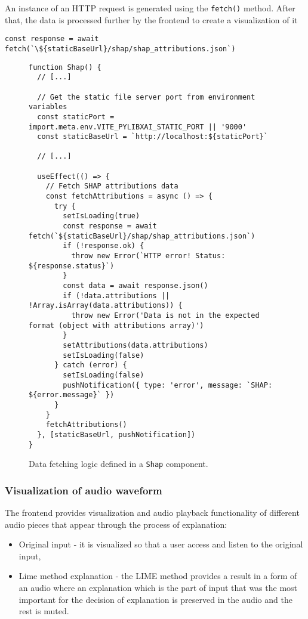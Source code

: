 \documentclass[
    bindingoffset=5mm,  %
    footnoteindent=3mm, %
    hyphenation=true    %
]{src/wut-thesis}
\begin{document}
An instance of an HTTP request is generated using the \texttt{fetch()} method. After that, the data is processed further by the frontend to create a visualization of it
\begin{verbatim}
const response = await fetch(`\${staticBaseUrl}/shap/shap_attributions.json`)
\end{verbatim}

\begin{figure}%
\begin{verbatim}
function Shap() {
  // [...]

  // Get the static file server port from environment variables
  const staticPort = import.meta.env.VITE_PYLIBXAI_STATIC_PORT || '9000'
  const staticBaseUrl = `http://localhost:${staticPort}`

  // [...]

  useEffect(() => {
    // Fetch SHAP attributions data
    const fetchAttributions = async () => {
      try {
        setIsLoading(true)
        const response = await fetch(`${staticBaseUrl}/shap/shap_attributions.json`)
        if (!response.ok) {
          throw new Error(`HTTP error! Status: ${response.status}`)
        }
        const data = await response.json()
        if (!data.attributions || !Array.isArray(data.attributions)) {
          throw new Error('Data is not in the expected format (object with attributions array)')
        }
        setAttributions(data.attributions)
        setIsLoading(false)
      } catch (error) {
        setIsLoading(false)
        pushNotification({ type: 'error', message: `SHAP: ${error.message}` })
      }
    }
    fetchAttributions()
  }, [staticBaseUrl, pushNotification])
}
\end{verbatim}
\caption{Data fetching logic defined in a \texttt{Shap} component.}
\label{fig:ShapComponentDataFetching}
\end{figure}
    
\subsubsection{Visualization of audio waveform}

The frontend provides visualization and audio playback functionality of
different audio pieces that appear through the process of explanation:

\begin{itemize}
    \item Original input - it is visualized so that a user access and listen
          to the original input,
    \item Lime method explanation - the LIME method provides a result in a form of an audio
          where an explanation which is the part of input that was the most important for
          the decision of explanation is preserved in the audio and the rest is muted.
\end{itemize}
\end{document}
